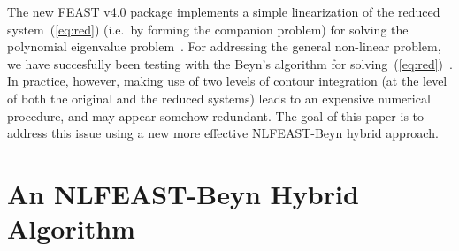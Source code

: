 \documentclass[onefignum,onetabnum]{siamart190516}
\begin{document}


\begin{algorithm}
\caption{NLFEAST}
\label{alg:nlfeast}
\begin{algorithmic}
	\ENDWHILE
\end{algorithmic}
\end{algorithm}



The new FEAST v4.0 package implements a simple linearization of the reduced system~(\ref{eq:red})
(i.e.~by forming the companion problem) for solving the polynomial eigenvalue problem~\cite{polizzi2020}. For addressing the general non-linear problem,
we have succesfully been testing with the Beyn's algorithm for solving~(\ref{eq:red})~\cite{gavin2018a}. 
In practice, however, making use of two levels of contour integration
(at the level of both the original and the reduced systems)
leads to an expensive numerical procedure, and may appear somehow redundant.
The goal of this paper is to address this issue using a new more effective NLFEAST-Beyn hybrid approach.


\section{An NLFEAST-Beyn Hybrid Algorithm}
\label{sec:alg}
\end{document}
